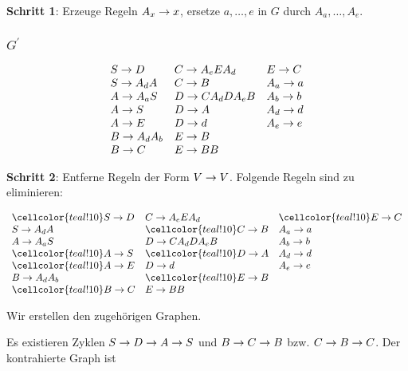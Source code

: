 \documentclass{article}
\begin{document}
\textbf{Schritt 1}: Erzeuge Regeln $A_x \rightarrow x$, ersetze $a,\ldots,e$ in $G$ durch
$A_a,\ldots,A_e$.

\subsubsection{$G^\prime$}

\begin{align*}
\begin{array}{lll}
   S \rightarrow D & C \rightarrow A_eEA_d & E \rightarrow C \\
   S \rightarrow A_dA & C \rightarrow B & A_a \rightarrow a \\
   A \rightarrow A_aS & D \rightarrow CA_dDA_eB & A_b \rightarrow b \\
   A \rightarrow S & D \rightarrow A & A_d \rightarrow d \\
   A \rightarrow E & D \rightarrow d & A_e \rightarrow e \\
   B \rightarrow A_dA_b & E \rightarrow B \\
   B \rightarrow C & E \rightarrow BB
\end{array}
\end{align*}

\textbf{Schritt 2}: Entferne Regeln der Form $V \rightarrow V$. Folgende Regeln sind zu
eliminieren:

\begin{align*}
\begin{array}{lll}
   \cellcolor{teal!10} S \r D & C \r A_eEA_d & \cellcolor{teal!10} E \r C \\
   S \r A_dA & \cellcolor{teal!10} C \r B & A_a \r a \\
   A \r A_aS & D \r CA_dDA_eB & A_b \r b \\
   \cellcolor{teal!10} A \r S & \cellcolor{teal!10} D \r A & A_d \r d \\
   \cellcolor{teal!10} A \r E & D \r d & A_e \r e \\
   B \r A_dA_b & \cellcolor{teal!10} E \r B \\
   \cellcolor{teal!10} B \r C & E \r BB
\end{array}
\end{align*}

Wir erstellen den zugeh\"origen Graphen.

\begin{center}
\end{center}
 Es existieren Zyklen $S \rightarrow D \rightarrow A \rightarrow S$ und $B \rightarrow C \rightarrow B$ bzw. $C \rightarrow B \rightarrow C$.
 Der kontrahierte Graph ist
\end{document}
